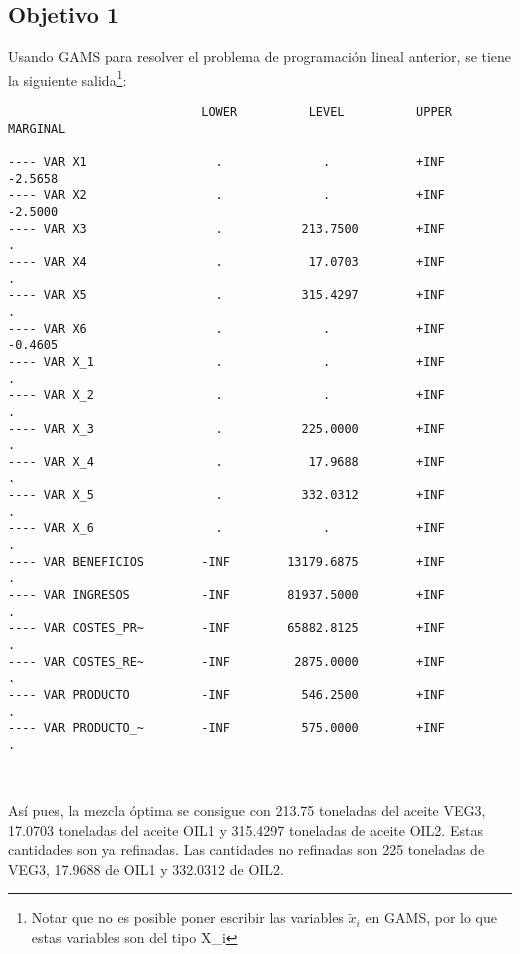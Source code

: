 \documentclass[12pt,a4paper,twoside,openright,titlepage,final]{article}
\begin{document}
\subsection{Objetivo 1}

Usando GAMS para resolver el problema de programación lineal anterior, se tiene la siguiente salida\footnote{Notar que no es posible poner escribir las variables $\tilde{x}_i$ en GAMS, por lo que estas variables son del tipo X\_i}:

\begin{verbatim}
                           LOWER          LEVEL          UPPER         MARGINAL

---- VAR X1                  .              .            +INF           -2.5658      
---- VAR X2                  .              .            +INF           -2.5000      
---- VAR X3                  .           213.7500        +INF             .          
---- VAR X4                  .            17.0703        +INF             .          
---- VAR X5                  .           315.4297        +INF             .          
---- VAR X6                  .              .            +INF           -0.4605      
---- VAR X_1                 .              .            +INF             .          
---- VAR X_2                 .              .            +INF             .          
---- VAR X_3                 .           225.0000        +INF             .          
---- VAR X_4                 .            17.9688        +INF             .          
---- VAR X_5                 .           332.0312        +INF             .          
---- VAR X_6                 .              .            +INF             .          
---- VAR BENEFICIOS        -INF        13179.6875        +INF             .          
---- VAR INGRESOS          -INF        81937.5000        +INF             .          
---- VAR COSTES_PR~        -INF        65882.8125        +INF             .          
---- VAR COSTES_RE~        -INF         2875.0000        +INF             .          
---- VAR PRODUCTO          -INF          546.2500        +INF             .          
---- VAR PRODUCTO_~        -INF          575.0000        +INF             .          

     
\end{verbatim}

Así pues, la mezcla óptima se consigue con 213.75 toneladas del aceite VEG3, 17.0703 toneladas del aceite OIL1 y 315.4297 toneladas de aceite OIL2. Estas cantidades son ya refinadas. Las cantidades no refinadas son 225 toneladas de VEG3, 17.9688 de OIL1 y 332.0312 de OIL2.\\
\end{document}
